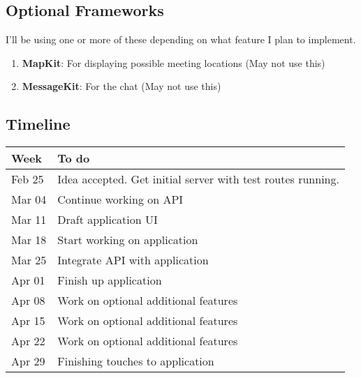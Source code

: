 \documentclass[11pt]{article}
\begin{document}
\subsection{Optional Frameworks}
\label{sec:orgd4747c1}

I'll be using one or more of these depending on what feature I plan to implement. 

\begin{enumerate}
\item \textbf{MapKit}: For displaying possible meeting locations (May not use this)
\item \textbf{MessageKit}: For the chat (May not use this)
\end{enumerate}

\subsection{Timeline}
\label{sec:org91dadb8}

\begin{center}
\begin{tabular}{ll}
Week & To do\\
\hline
Feb 25 & Idea accepted. Get initial server with test routes running.\\
Mar 04 & Continue working on API\\
Mar 11 & Draft application UI\\
Mar 18 & Start working on application\\
Mar 25 & Integrate API with application\\
Apr 01 & Finish up application\\
Apr 08 & Work on optional additional features\\
Apr 15 & Work on optional additional features\\
Apr 22 & Work on optional additional features\\
Apr 29 & Finishing touches to application\\
\end{tabular}
\end{center}
\end{document}
